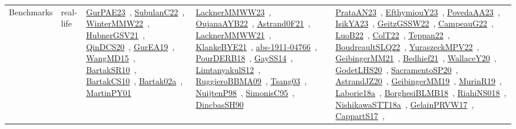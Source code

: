 {\begin{longtable}{lp{3cm}>{\raggedright\arraybackslash}p{6cm}>{\raggedright\arraybackslash}p{6cm}>{\raggedright\arraybackslash}p{8cm}}
Benchmarks & real-life & \href{articles/GurPAE23.pdf}{GurPAE23}~\cite{GurPAE23}, \href{articles/SubulanC22.pdf}{SubulanC22}~\cite{SubulanC22}, \href{papers/WinterMMW22.pdf}{WinterMMW22}~\cite{WinterMMW22}, \href{articles/HubnerGSV21.pdf}{HubnerGSV21}~\cite{HubnerGSV21}, \href{articles/QinDCS20.pdf}{QinDCS20}~\cite{QinDCS20}, \href{articles/GurEA19.pdf}{GurEA19}~\cite{GurEA19}, \href{articles/WangMD15.pdf}{WangMD15}~\cite{WangMD15}, \href{articles/BartakSR10.pdf}{BartakSR10}~\cite{BartakSR10}, \href{articles/BartakCS10.pdf}{BartakCS10}~\cite{BartakCS10}, \href{papers/Bartak02a.pdf}{Bartak02a}~\cite{Bartak02a}, \href{articles/MartinPY01.pdf}{MartinPY01}~\cite{MartinPY01} & \href{articles/LacknerMMWW23.pdf}{LacknerMMWW23}~\cite{LacknerMMWW23}, \href{papers/OujanaAYB22.pdf}{OujanaAYB22}~\cite{OujanaAYB22}, \href{papers/Astrand0F21.pdf}{Astrand0F21}~\cite{Astrand0F21}, \href{papers/LacknerMMWW21.pdf}{LacknerMMWW21}~\cite{LacknerMMWW21}, \href{papers/KlankeBYE21.pdf}{KlankeBYE21}~\cite{KlankeBYE21}, \href{articles/abs-1911-04766.pdf}{abs-1911-04766}~\cite{abs-1911-04766}, \href{articles/PourDERB18.pdf}{PourDERB18}~\cite{PourDERB18}, \href{papers/GaySS14.pdf}{GaySS14}~\cite{GaySS14}, \href{articles/LimtanyakulS12.pdf}{LimtanyakulS12}~\cite{LimtanyakulS12}, \href{articles/RuggieroBBMA09.pdf}{RuggieroBBMA09}~\cite{RuggieroBBMA09}, \href{articles/Tsang03.pdf}{Tsang03}~\cite{Tsang03}, \href{articles/NuijtenP98.pdf}{NuijtenP98}~\cite{NuijtenP98}, \href{papers/SimonisC95.pdf}{SimonisC95}~\cite{SimonisC95}, \href{articles/DincbasSH90.pdf}{DincbasSH90}~\cite{DincbasSH90} & \href{articles/PrataAN23.pdf}{PrataAN23}~\cite{PrataAN23}, \href{papers/EfthymiouY23.pdf}{EfthymiouY23}~\cite{EfthymiouY23}, \href{papers/PovedaAA23.pdf}{PovedaAA23}~\cite{PovedaAA23}, \href{articles/IsikYA23.pdf}{IsikYA23}~\cite{IsikYA23}, \href{papers/GeitzGSSW22.pdf}{GeitzGSSW22}~\cite{GeitzGSSW22}, \href{articles/CampeauG22.pdf}{CampeauG22}~\cite{CampeauG22}, \href{papers/LuoB22.pdf}{LuoB22}~\cite{LuoB22}, \href{articles/ColT22.pdf}{ColT22}~\cite{ColT22}, \href{papers/Teppan22.pdf}{Teppan22}~\cite{Teppan22}, \href{papers/BoudreaultSLQ22.pdf}{BoudreaultSLQ22}~\cite{BoudreaultSLQ22}, \href{articles/YuraszeckMPV22.pdf}{YuraszeckMPV22}~\cite{YuraszeckMPV22}, \href{papers/GeibingerMM21.pdf}{GeibingerMM21}~\cite{GeibingerMM21}, \href{articles/Bedhief21.pdf}{Bedhief21}~\cite{Bedhief21}, \href{articles/WallaceY20.pdf}{WallaceY20}~\cite{WallaceY20}, \href{papers/GodetLHS20.pdf}{GodetLHS20}~\cite{GodetLHS20}, \href{articles/SacramentoSP20.pdf}{SacramentoSP20}~\cite{SacramentoSP20}, \href{articles/AstrandJZ20.pdf}{AstrandJZ20}~\cite{AstrandJZ20}, \href{papers/GeibingerMM19.pdf}{GeibingerMM19}~\cite{GeibingerMM19}, \href{papers/MurinR19.pdf}{MurinR19}~\cite{MurinR19}, \href{papers/Laborie18a.pdf}{Laborie18a}~\cite{Laborie18a}, \href{articles/BorghesiBLMB18.pdf}{BorghesiBLMB18}~\cite{BorghesiBLMB18}, \href{papers/RiahiNS018.pdf}{RiahiNS018}~\cite{RiahiNS018}, \href{papers/NishikawaSTT18a.pdf}{NishikawaSTT18a}~\cite{NishikawaSTT18a}, \href{papers/GelainPRVW17.pdf}{GelainPRVW17}~\cite{GelainPRVW17}, \href{papers/CappartS17.pdf}{CappartS17}~\cite{CappartS17}, 
\end{longtable}}
